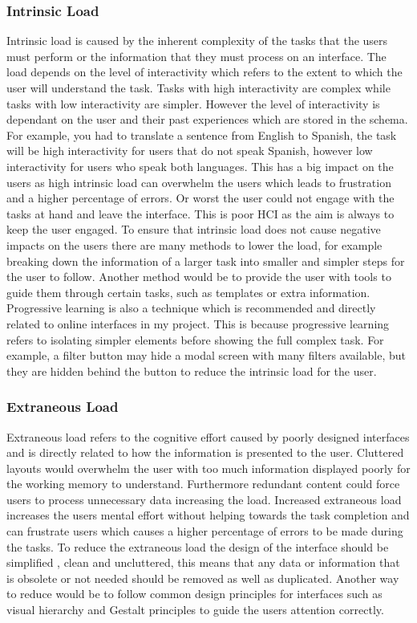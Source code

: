 \documentclass[]{project_final}
\begin{document}
\subsubsection{Intrinsic Load}
Intrinsic load is caused by the inherent complexity of the tasks that the users must perform
or the information that they must process on an interface. The load depends on the level
of interactivity which refers to the extent to which the user will understand the task. Tasks
with high interactivity are complex while tasks with low interactivity are simpler. However
the level of interactivity is dependant on the user and their past experiences which are stored
in the schema. For example, you had to translate a sentence from English to Spanish, the
task will be high interactivity for users that do not speak Spanish, however low interactivity
for users who speak both languages.
This has a big impact on the users as high intrinsic load can overwhelm the users which leads
to frustration and a higher percentage of errors. Or worst the user could not engage with the
tasks at hand and leave the interface. This is poor HCI as the aim is always to keep the user
engaged.
To ensure that intrinsic load does not cause negative impacts on the users there are many
methods to lower the load, for example breaking down the information of a larger task into
smaller and simpler steps for the user to follow. Another method would be to provide the
user with tools to guide them through certain tasks, such as templates or extra information.
Progressive learning is also a technique which is recommended and directly related to online
interfaces in my project. This is because progressive learning refers to isolating simpler
elements before showing the full complex task. For example, a filter button may hide a
modal screen with many filters available, but they are hidden behind the button to reduce
the intrinsic load for the user.\cite{de_jong_cognitive_2010}
\subsubsection{Extraneous Load}
Extraneous load refers to the cognitive effort caused by poorly designed interfaces and is
directly related to how the information is presented to the user. Cluttered layouts would
overwhelm the user with too much information displayed poorly for the working memory to
understand. Furthermore redundant content could force users to process unnecessary data
increasing the load.
Increased extraneous load increases the users mental effort without helping towards the task
completion and can frustrate users which causes a higher percentage of errors to be made
during the tasks.
To reduce the extraneous load the design of the interface should be simplified , clean and
uncluttered, this means that any data or information that is obsolete or not needed should
be removed as well as duplicated. Another way to reduce would be to follow common design
principles for interfaces such as visual hierarchy and Gestalt principles to guide the users
attention correctly.\cite{de_jong_cognitive_2010}
\end{document}
